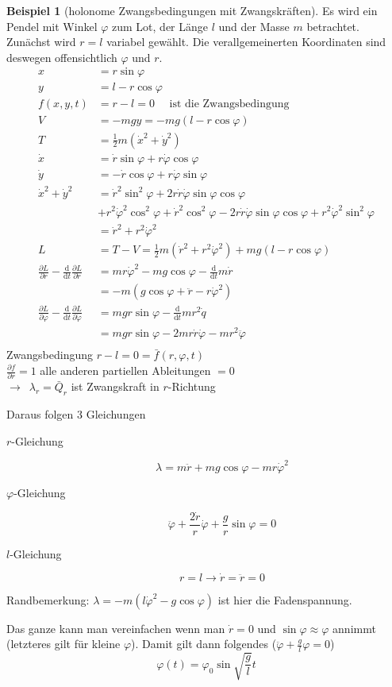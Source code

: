 \documentclass[oneside]{book}
\theoremstyle{definition}
\newtheorem*{beispiel*}{Beispiel}
\newcommand{\conseq}{$\rightarrow$~}
\renewcommand{\d}{\mathrm d}
\newcommand{\dd}[1]{\frac{\d}{\d #1}}
\newcommand{\ffpartial}[2]{\frac{\partial #1}{\partial #2}}
\newcommand{\vp}{\varphi}
\begin{document}
\begin{beispiel*}[holonome Zwangsbedingungen mit Zwangskräften]
Es wird ein Pendel mit Winkel $\varphi$ zum Lot, der Länge $l$ und der Masse $m$ betrachtet.
Zunächst wird $r=l$ variabel gewählt. Die verallgemeinerten Koordinaten sind deswegen offensichtlich $\varphi$ und $r$.
\begin{align*}
x &= r \sin \varphi\\
y &= l - r \cos \varphi\\
f(x,y,t) &= r - l = 0 \text{~~~~ist die Zwangsbedingung}\\
V &= -mg y = -mg (l -r \cos \varphi)\\
T &= \frac12 m (\dot{x}^2 + \dot{y}^2)\\
\dot{x} &= \dot{r} \sin \varphi + r \dot{\varphi} \cos \varphi\\
\dot{y} &= - \dot{r} \cos \varphi + r \dot{\varphi} \sin \varphi\\
\dot{x}^2 + \dot{y}^2 &= \dot{r}^2 \sin^2 \varphi + 2 r \dot{r} \dot\varphi \sin \varphi \cos \varphi \\
&+ r^2 \dot{\varphi}^2 \cos^2 \varphi + \dot{r}^2 \cos^2 \varphi - 2 r \dot r \dot \varphi \sin \varphi \cos \varphi + r^2 \dot{\varphi}^2 \sin^2 \varphi \\
&= \dot{r}^2 + r^2 \dot{\varphi}^2\\
L &= T-V = \frac12 m (\dot{r}^2 + r^2 \dot{\varphi}^2) + mg(l - r \cos \varphi)\\
\ffpartial{L}{r} - \dd t \ffpartial{L}{\dot{r}} &= m r \dot{\varphi}^2 - mg \cos \varphi - \dd t m \dot{r} \\
&= -m (g \cos \varphi + \ddot{r} - r \dot{\varphi}^2)\\
\ffpartial{L}{\varphi} - \dd t \ffpartial{L}{\dot{\varphi}} &= mgr \sin \varphi - \dd t m r^2 \dot{q} \\
&= mgr \sin \varphi - 2mr\dot{r}\dot{\varphi} - mr^2 \ddot{\varphi}\\
\end{align*}
Zwangsbedingung $r-l = 0 = \bar{f}(r, \varphi, t)$\\
$\ffpartial{f}{r} = 1$ alle anderen partiellen Ableitungen $= 0$\\
\conseq $\lambda_r = \bar{Q}_r$ ist Zwangskraft in $r$-Richtung

Daraus folgen 3 Gleichungen
\begin{description}
	\item[$r$-Gleichung] $$\lambda = m \ddot{r} + mg \cos \varphi - m r \dot{\varphi}^2$$
	\item[$\varphi$-Gleichung] $$\ddot{\varphi} + \frac{2 \dot{r}}{r} \dot{\varphi} + \frac{g}{r} \sin \varphi = 0$$
	\item[$l$-Gleichung] $$r = l \rightarrow \dot{r} = \ddot{r} = 0 $$
\end{description}
Randbemerkung: $\lambda = -m(l \dot{\varphi}^2 - g \cos \varphi)$ ist hier die Fadenspannung.

Das ganze kann man vereinfachen wenn man $\dot{r} = 0$ und $\sin \varphi \approx \varphi$ annimmt (letzteres gilt für kleine $\varphi$). Damit gilt dann folgendes ($\ddot{\vp} + \frac{g}{l} \vp = 0$)
$$\varphi(t) = \varphi_0 \sin \sqrt{\frac{g}{l}} t$$
\end{beispiel*}
\end{document}
